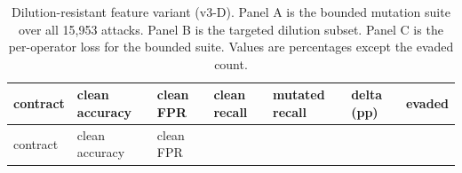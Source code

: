 \documentclass[preprint,11pt]{elsarticle}
\begin{document}
{
\begingroup\scriptsize\setlength{\tabcolsep}{3pt}
\begin{longtable}[]{@{}
  >{\raggedright\arraybackslash}p{}
  >{\raggedleft\arraybackslash}p{}
  >{\raggedleft\arraybackslash}p{}
  >{\raggedleft\arraybackslash}p{}
  >{\raggedleft\arraybackslash}p{}
  >{\raggedleft\arraybackslash}p{}
  >{\raggedleft\arraybackslash}p{}@{}}
\caption{Dilution-resistant feature variant (v3-D). Panel A is
the bounded mutation suite over all 15,953 attacks. Panel B is the
targeted dilution subset. Panel C is the per-operator loss for the
bounded suite. Values are percentages except the evaded count.}\label{tab:dilution}\\
\toprule\noalign{}
\begin{minipage}[t]{\linewidth}\raggedright
contract
\end{minipage} & \begin{minipage}[t]{\linewidth}\raggedleft
clean accuracy
\end{minipage} & \begin{minipage}[t]{\linewidth}\raggedleft
clean FPR
\end{minipage} & \begin{minipage}[t]{\linewidth}\raggedleft
clean recall
\end{minipage} & \begin{minipage}[t]{\linewidth}\raggedleft
mutated recall
\end{minipage} & \begin{minipage}[t]{\linewidth}\raggedleft
delta (pp)
\end{minipage} & \begin{minipage}[t]{\linewidth}\raggedleft
evaded
\end{minipage} \\
\midrule\noalign{}
\endfirsthead
\toprule\noalign{}
\begin{minipage}[t]{\linewidth}\raggedright
contract
\end{minipage} & \begin{minipage}[t]{\linewidth}\raggedleft
clean accuracy
\end{minipage} & \begin{minipage}[t]{\linewidth}\raggedleft
clean FPR
\end{minipage} & \begin{minipage}[t]{\linewidth}\raggedleft

\end{minipage}
\end{longtable}}
\end{document}
